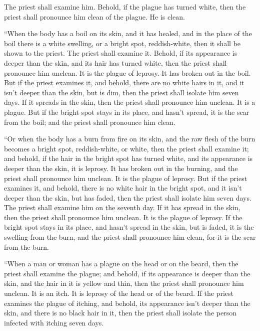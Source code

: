 {The priest shall examine him. Behold, if the plague has turned white, then the priest shall pronounce him clean of the plague. He is clean.
\par }{\PP {}“When the body has a boil on its skin, and it has healed,
and in the place of the boil there is a white swelling, or a bright spot, reddish-white, then it shall be shown to the priest.
The priest shall examine it. Behold, if its appearance is deeper than the skin, and its hair has turned white, then the priest shall pronounce him unclean. It is the plague of leprosy. It has broken out in the boil.
But if the priest examines it, and behold, there are no white hairs in it, and it isn’t deeper than the skin, but is dim, then the priest shall isolate him seven days.
If it spreads in the skin, then the priest shall pronounce him unclean. It is a plague.
But if the bright spot stays in its place, and hasn’t spread, it is the scar from the boil; and the priest shall pronounce him clean.
\par }{\PP {}“Or when the body has a burn from fire on its skin, and the raw flesh of the burn becomes a bright spot, reddish-white, or white,
then the priest shall examine it; and behold, if the hair in the bright spot has turned white, and its appearance is deeper than the skin, it is leprosy. It has broken out in the burning, and the priest shall pronounce him unclean. It is the plague of leprosy.
But if the priest examines it, and behold, there is no white hair in the bright spot, and it isn’t deeper than the skin, but has faded, then the priest shall isolate him seven days.
The priest shall examine him on the seventh day. If it has spread in the skin, then the priest shall pronounce him unclean. It is the plague of leprosy.
If the bright spot stays in its place, and hasn’t spread in the skin, but is faded, it is the swelling from the burn, and the priest shall pronounce him clean, for it is the scar from the burn.
\par }{\PP {}“When a man or woman has a plague on the head or on the beard,
then the priest shall examine the plague; and behold, if its appearance is deeper than the skin, and the hair in it is yellow and thin, then the priest shall pronounce him unclean. It is an itch. It is leprosy of the head or of the beard.
If the priest examines the plague of itching, and behold, its appearance isn’t deeper than the skin, and there is no black hair in it, then the priest shall isolate the person infected with itching seven days.
}
